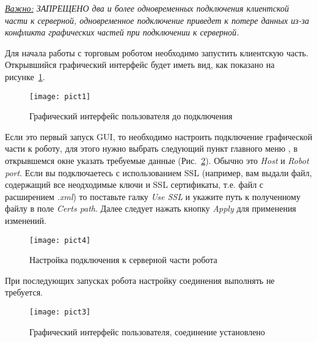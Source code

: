 \noindent\textit{\underline{Важно:} ЗАПРЕЩЕНО два и более одновременных подключения клиентской части к серверной, одновременное подключение приведет к потере данных из-за
конфликта графических частей при подключении к серверной.}


Для начала работы с торговым роботом необходимо запустить клиентскую часть. Открывшийся графический интерфейс будет иметь вид, как показано на рисунке~\ref{fig:gui}.

\begin{figure}[h]
\centering
\texttt{[image: pict1]}
\caption{Графический интерфейс пользователя до подключения}
\label{fig:gui}
\end{figure}

Если это первый запуск GUI, то необходимо настроить подключение графической части к роботу, для этого нужно выбрать следующий 
пункт главного меню , в открывшемся окне указать требуемые
данные (Рис.~\ref{fig:connection}). Обычно это \emph{Host} и \emph{Robot port}. Если вы подключаетесь с использованием SSL (например, вам выдали файл, содержащий все неодходимые ключи и SSL сертификаты, т.е. файл с расширением \textit{.xml})
то поставьте галку \textit{Use SSL} и укажите путь к полученному файлу в поле \textit{Certs path}.
Далее следует нажать кнопку \emph{Apply} для применения изменений.
\begin{figure}[h!]
\centering
\texttt{[image: pict4]}
\caption{Настройка подключения к серверной части робота}
\label{fig:connection}
\end{figure}
При последующих запусках робота настройку соединения выполнять не требуется.
\begin{figure}[h!]
\centering
\texttt{[image: pict3]}
\caption{Графический интерфейс пользователя, соединение установлено}
\label{fig:gui_connected}
\end{figure}

